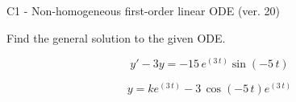 \begin{exercise}
  \begin{exerciseTitle}C1 - Non-homogeneous first-order linear ODE (ver. 20)\end{exerciseTitle}
  \begin{exerciseStatement}
    
Find the general solution to the given ODE.

    
\[y'-3y= -15 \, e^{\left(3 \, t\right)} \sin\left(-5 \, t\right)\]

  \end{exerciseStatement}
  \begin{exerciseAnswer}
    
\[y= k e^{\left(3 \, t\right)} - 3 \, \cos\left(-5 \, t\right) e^{\left(3 \, t\right)}\]

  \end{exerciseAnswer}
\end{exercise}